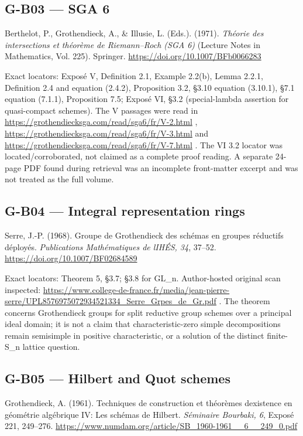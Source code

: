 \documentclass[11pt,a4paper]{article}
\theoremstyle{definition}\newtheorem{definition}{Definition}
\begin{document}
\subsection{G-B03 --- SGA 6}\label{g-b03--sga-6}

Berthelot, P., Grothendieck, A., \& Illusie, L. (Eds.). (1971).
\emph{Théorie des intersections et théorème de Riemann--Roch (SGA 6)}
(Lecture Notes in Mathematics, Vol. 225). Springer.
\url{https://doi.org/10.1007/BFb0066283}

Exact locators: Exposé V, Definition 2.1, Example 2.2(b), Lemma 2.2.1,
Definition 2.4 and equation (2.4.2), Proposition 3.2, §3.10 equation
(3.10.1), §7.1 equation (7.1.1), Proposition 7.5; Exposé VI, §3.2
(special-lambda assertion for quasi-compact schemes). The V passages
were read in \url{https://grothendiecksga.com/read/sga6/fr/V-2.html} ,
\url{https://grothendiecksga.com/read/sga6/fr/V-3.html} and
\url{https://grothendiecksga.com/read/sga6/fr/V-7.html} . The VI 3.2
locator was located/corroborated, not claimed as a complete proof
reading. A separate 24-page PDF found during retrieval was an incomplete
front-matter excerpt and was not treated as the full volume.

\subsection{G-B04 --- Integral representation
rings}\label{g-b04--integral-representation-rings}

Serre, J.-P. (1968). Groupe de Grothendieck des schémas en groupes
réductifs déployés. \emph{Publications Mathématiques de
l\textquotesingle IHÉS, 34}, 37--52.
\url{https://doi.org/10.1007/BF02684589}

Exact locators: Theorem 5, §3.7; §3.8 for GL\_n. Author-hosted original
scan inspected:
\url{https://www.college-de-france.fr/media/jean-pierre-serre/UPL8576975072934521334_Serre_Grpes_de_Gr.pdf}
. The theorem concerns Grothendieck groups for split reductive group
schemes over a principal ideal domain; it is not a claim that
characteristic-zero simple decompositions remain semisimple in positive
characteristic, or a solution of the distinct finite-S\_n lattice
question.

\subsection{G-B05 --- Hilbert and Quot
schemes}\label{g-b05--hilbert-and-quot-schemes}

Grothendieck, A. (1961). Techniques de construction et théorèmes
d\textquotesingle existence en géométrie algébrique IV: Les schémas de
Hilbert. \emph{Séminaire Bourbaki, 6}, Exposé 221, 249--276.
\url{https://www.numdam.org/article/SB_1960-1961__6__249_0.pdf}
\end{document}
